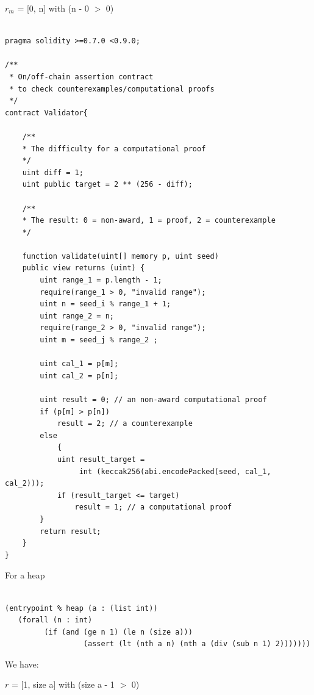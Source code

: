 \documentclass[runningheads]{llncs}
\begin{document}
$r_{m}$ = [0, n] with (n - 0 $>$ 0)

\begin{lstlisting}[numbers=none]

pragma solidity >=0.7.0 <0.9.0;

/**
 * On/off-chain assertion contract 
 * to check counterexamples/computational proofs
 */
contract Validator{

    /**
    * The difficulty for a computational proof
    */
    uint diff = 1;
    uint public target = 2 ** (256 - diff); 

    /**
    * The result: 0 = non-award, 1 = proof, 2 = counterexample
    */

    function validate(uint[] memory p, uint seed)
    public view returns (uint) {
        uint range_1 = p.length - 1; 
        require(range_1 > 0, "invalid range");
        uint n = seed_i % range_1 + 1;
        uint range_2 = n;
        require(range_2 > 0, "invalid range");
        uint m = seed_j % range_2 ;
        
        uint cal_1 = p[m];
        uint cal_2 = p[n];

        uint result = 0; // an non-award computational proof 
        if (p[m] > p[n])  
            result = 2; // a counterexample
        else 
            {
            uint result_target = 
                 int (keccak256(abi.encodePacked(seed, cal_1, cal_2)));
            if (result_target <= target) 
                result = 1; // a computational proof      
        }             
        return result;           
    }
}

\end{lstlisting}

For a heap

\begin{lstlisting}[numbers=none]

(entrypoint % heap (a : (list int))
   (forall (n : int)
         (if (and (ge n 1) (le n (size a)))
                  (assert (lt (nth a n) (nth a (div (sub n 1) 2)))))))
\end{lstlisting}


\noindent We have:

$r$ = [1, size a] with (size a - 1 $>$ 0)
\end{document}

